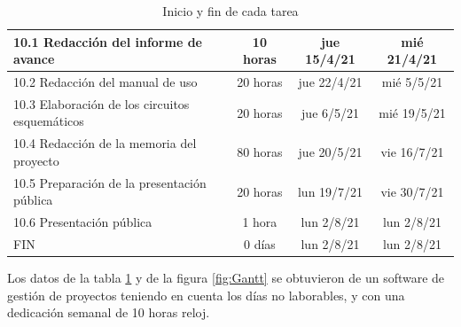 \documentclass[11pt]{charter}
\begin{document}
\begin{table}[htbp]
{\begin{tabular}{|p{25em}|c|c|c|}
\hline 10.1 Redacción del informe de avance & 10 horas & jue 15/4/21 & mié 21/4/21 \\
\hline 10.2 Redacción del manual de uso & 20 horas & jue 22/4/21 & mié 5/5/21 \\
\hline 10.3 Elaboración de los circuitos esquemáticos & 20 horas & jue 6/5/21 & mié 19/5/21 \\
\hline 10.4 Redacción de la memoria del proyecto & 80 horas & jue 20/5/21 & vie 16/7/21 \\
\hline 10.5 Preparación de la presentación pública & 20 horas & lun 19/7/21 & vie 30/7/21 \\
\hline 10.6 Presentación pública & 1 hora & lun 2/8/21 & lun 2/8/21 \\
\hline FIN   & 0 días & lun 2/8/21 & lun 2/8/21 \\
\hline
\end{tabular}}
\caption{Inicio y fin de cada tarea}
\label{tab:CuadroGantt}
\end{table}

Los datos de la tabla \ref{tab:CuadroGantt} y de la figura \ref{fig:Gantt} se obtuvieron de un software de gestión de proyectos teniendo en cuenta los días no laborables, y con una dedicación semanal de 10 horas reloj.  



\end{document}
